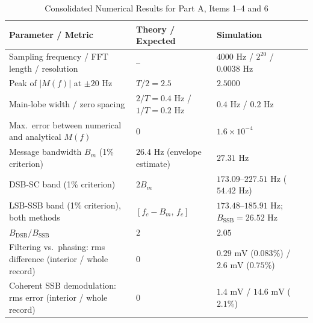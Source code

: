 \documentclass[a4paper]{article}
\begin{document}
\begin{table}[H]
\centering
\caption{Consolidated Numerical Results for Part A, Items 1--4 and 6}
\label{tab:results_summary_1to4_6}
\small
\begin{tabular}{p{} p{} p{}}
\toprule
\textbf{Parameter / Metric} & \textbf{Theory / Expected} & \textbf{Simulation} \\
\midrule
Sampling frequency / FFT length / resolution & -- & $4000\text{ Hz}$ / $2^{20}$ / $0.0038\text{ Hz}$ \\
Peak of $|M(f)|$ at $\pm 20\text{ Hz}$ & $T/2 = 2.5$ & $2.5000$ \\
Main-lobe width / zero spacing & $2/T = 0.4\text{ Hz}$ / $1/T = 0.2\text{ Hz}$ & $0.4\text{ Hz}$ / $0.2\text{ Hz}$ \\
Max.\ error between numerical and analytical $M(f)$ & $0$ & $1.6\times 10^{-4}$ \\
Message bandwidth $B_m$ (1\% criterion) & $26.4\text{ Hz}$ (envelope estimate) & $27.31\text{ Hz}$ \\
DSB-SC band (1\% criterion) & $2B_m$ & $173.09$--$227.51\text{ Hz}$ ($54.42\text{ Hz}$) \\
LSB-SSB band (1\% criterion), both methods & $[f_c - B_m,\,f_c]$ & $173.48$--$185.91\text{ Hz}$; $B_{\text{SSB}} = 26.52\text{ Hz}$ \\
$B_{\text{DSB}}/B_{\text{SSB}}$ & $2$ & $2.05$ \\
Filtering vs.\ phasing: rms difference (interior / whole record) & $0$ & $0.29\text{ mV}$ ($0.083\%$) / $2.6\text{ mV}$ ($0.75\%$) \\
Coherent SSB demodulation: rms error (interior / whole record) & $0$ & $1.4\text{ mV}$ / $14.6\text{ mV}$ ($2.1\%$) \\
\bottomrule
\end{tabular}
\end{table}
\end{document}
